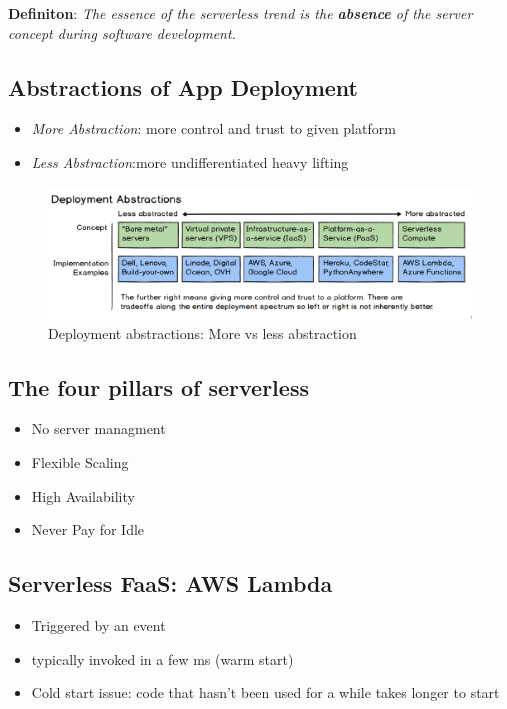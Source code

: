 \documentclass[a4paper]{article}
\begin{document}
\begin{multicols}{3}
\textbf{Definiton}: \textit{The essence of the serverless trend is the \textbf{absence} of the server concept during software development.}

\subsection{Abstractions of App Deployment}
\begin{itemize}
    \item \textit{More Abstraction}: more control and trust to given platform
    \item \textit{Less Abstraction}:more undifferentiated heavy lifting
\end{itemize}

\begin{figure}[H]
    \includegraphics[width=\linewidth]{deploymentabstractions.png}
    \caption{Deployment abstractions: More vs less abstraction}
    \label{fig:deploymentabstractions}
\end{figure}

\subsection{The four pillars of serverless}
\begin{itemize}
    \item No server managment
    \item Flexible Scaling
    \item High Availability
    \item Never Pay for Idle
\end{itemize}

\subsection{Serverless FaaS: AWS Lambda}
\begin{itemize}
    \item Triggered by an event
    \item typically invoked in a few ms (warm start)
    \item Cold start issue: code that hasn't been used for a while takes longer to start
\end{itemize}


\end{multicols}
\end{document}
